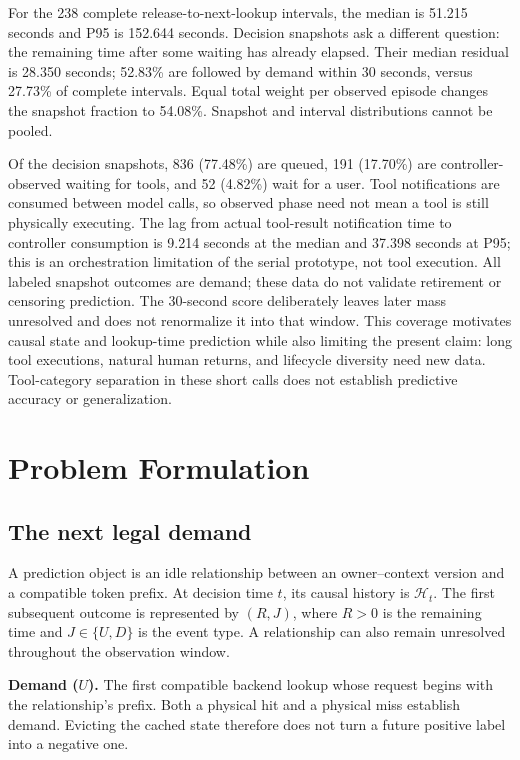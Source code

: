 \documentclass[sigconf, screen, review, balance=false]{acmart}
\begin{document}
For the 238 complete release-to-next-lookup intervals, the median is
51.215 seconds and P95 is 152.644 seconds. Decision snapshots ask a
different question: the remaining time after some waiting has already
elapsed. Their median residual is 28.350 seconds; 52.83\% are followed
by demand within 30 seconds, versus 27.73\% of complete intervals.
Equal total weight per observed episode changes the snapshot fraction
to 54.08\%. Snapshot and interval distributions cannot be pooled.

Of the decision snapshots, 836 (77.48\%) are queued, 191 (17.70\%)
are controller-observed waiting for tools, and 52 (4.82\%) wait for a
user. Tool notifications are consumed between model calls, so observed
phase need not mean a tool is still physically executing. The lag from
actual tool-result notification time to controller consumption is
9.214 seconds at the median and 37.398 seconds at P95; this is an
orchestration limitation of the serial prototype, not tool execution.
All labeled
snapshot outcomes are demand; these data do not validate retirement
or censoring prediction. The 30-second score deliberately leaves
later mass unresolved and does not renormalize it into that window.
This coverage motivates causal state and lookup-time prediction while
also limiting the present claim: long tool executions, natural human
returns, and lifecycle diversity need new data. Tool-category
separation in these short calls does not establish predictive accuracy
or generalization.


\FloatBarrier
\section{Problem Formulation}\label{problem-formulation}

\subsection{The next legal demand}\label{the-next-legal-demand}

A prediction object is an idle relationship between an owner--context
version and a compatible token prefix. At decision time \(t\), its
causal history is \(\mathcal H_t\). The first subsequent outcome is
represented by \((R,J)\), where \(R>0\) is the remaining time and
\(J\in\{U,D\}\) is the event type. A relationship can also remain
unresolved throughout the observation window.

\textbf{Demand (\(U\)).} The first compatible backend lookup whose
request begins with the relationship's prefix. Both a physical hit and a
physical miss establish demand. Evicting the cached state therefore does
not turn a future positive label into a negative one.
\end{document}
